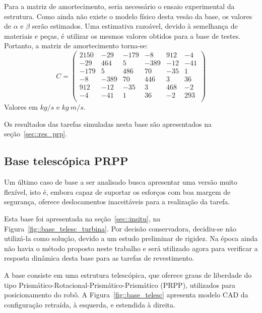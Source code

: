 Para a matriz de amortecimento, seria necessário o ensaio experimental da
estrutura. Como ainda não existe o modelo físico desta vesão da base, os valores
de $\alpha$ e $\beta$ serão estimados. Uma estimativa razoável, devido à
semelhança de materiais e peças, é utilizar os mesmos valores obtidos para a
base de testes.
Portanto, a matriz de amortecimento torna-se:
%
\begin{equation}
	C = 
\begin{pmatrix}
2150	&	-29	&	-179	&	-8	&	912	&	-4 \\
-29	&	464	&	5	&	-389	&	-12	&	-41 \\
-179	&	5	&	486	&	70	&	-35	&	1 \\
-8	&	-389	&	70	&	446	&	3	&	36 \\
912	&	-12	&	-35	&	3	&	468	&	-2 \\
-4	&	-41	&	1	&	36	&	-2	&	293 \\
\end{pmatrix}
\end{equation}
%
Valores em $kg/s$ e $kg~m/s$. 

Os resultados das tarefas simuladas nesta base são apresentados na
seção~\ref{sec::res_prp}.



\subsection{Base telescópica PRPP}

Um último caso de base a ser analisado busca apresentar uma versão muito
flexível, isto é, embora capaz de suportar os esforços com boa margem de
segurança, oferece deslocamentos inaceitáveis para a realização da tarefa.

Esta base foi apresentada na seção~\ref{sec::insitu}, na
Figura~\ref{fig::base_telesc_turbina}. Por decisão conservadora, decidiu-se não
utilizá-la como solução, devido a um estudo preliminar de rigidez. Na época
ainda não havia o método proposto neste trabalho e será utilizado agora para
verificar a resposta dinâmica desta base para as tarefas de revestimento.

A base consiste em uma estrutura telescópica, que oferece graus de liberdade do
tipo Prismático-Rotacional-Prismático-Prismático (PRPP), utilizados para
posicionamento do robô.
A Figura~\ref{fig::base_telesc} apresenta modelo CAD da configuração retraída, à
esquerda, e estendida à direita.

